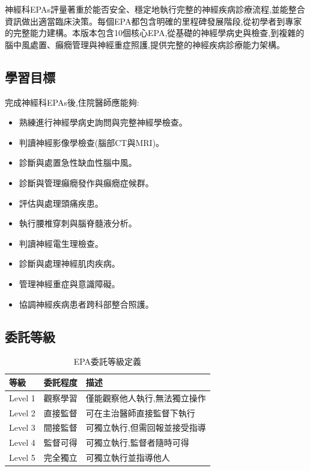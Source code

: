 \documentclass[12pt,a4paper]{article}
\newcommand{\note}[1]{
    \par
    \noindent
    \begin{tcolorbox}[
        colback=neuro_silver!5!white,
        colframe=neuro_silver,
        title=\textbf{重點提醒},
        fonttitle=\bfseries,
        boxrule=0.5pt,
        arc=3pt,
        left=6pt,
        right=6pt,
        top=6pt,
        bottom=6pt
    ]
    #1
    \end{tcolorbox}
}
\begin{document}
\vspace{0.5cm}
\note{
神經科EPAs評量著重於能否安全、穩定地執行完整的神經疾病診療流程,並能整合資訊做出適當臨床決策。每個EPA都包含明確的里程碑發展階段,從初學者到專家的完整能力建構。本版本包含10個核心EPA,從基礎的神經學病史與檢查,到複雜的腦中風處置、癲癇管理與神經重症照護,提供完整的神經疾病診療能力架構。
}

\subsection{學習目標}
完成神經科EPAs後,住院醫師應能夠:
\begin{itemize}[nosep]
    \item 熟練進行神經學病史詢問與完整神經學檢查。
    \item 判讀神經影像學檢查(腦部CT與MRI)。
    \item 診斷與處置急性缺血性腦中風。
    \item 診斷與管理癲癇發作與癲癇症候群。
    \item 評估與處理頭痛疾患。
    \item 執行腰椎穿刺與腦脊髓液分析。
    \item 判讀神經電生理檢查。
    \item 診斷與處理神經肌肉疾病。
    \item 管理神經重症與意識障礙。
    \item 協調神經疾病患者跨科部整合照護。
\end{itemize}

\subsection{委託等級}
\begin{table}[h]
    \centering
    \caption{EPA委託等級定義}
    \begin{tabular}{p{2cm} p{3cm} p{9cm}}
        \toprule
        \textbf{等級} & \textbf{委託程度} & \textbf{描述} \\
        \midrule
        Level 1 & 觀察學習 & 僅能觀察他人執行,無法獨立操作 \\
        Level 2 & 直接監督 & 可在主治醫師直接監督下執行 \\
        Level 3 & 間接監督 & 可獨立執行,但需回報並接受指導 \\
        Level 4 & 監督可得 & 可獨立執行,監督者隨時可得 \\
        Level 5 & 完全獨立 & 可獨立執行並指導他人 \\
        \bottomrule
    \end{tabular}
\end{table}
\end{document}

